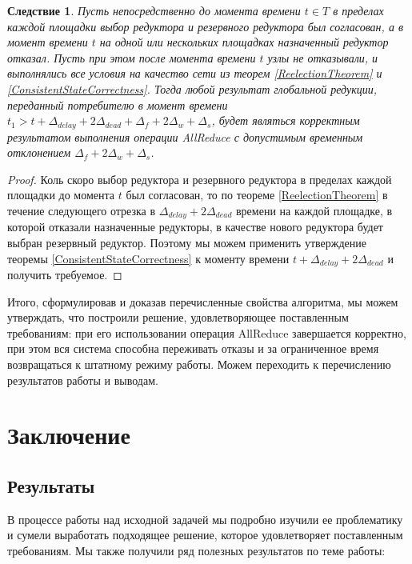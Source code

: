 \documentclass{article}
\theoremstyle{plain}
\theoremstyle{plain}
\newtheorem{consequence}[theorem]{Следствие}
\theoremstyle{plain}
\theoremstyle{plain}
\theoremstyle{definition}
\theoremstyle{remark}
\theoremstyle{plain}
\begin{document}
\begin{consequence}
    Пусть непосредственно до момента времени $t \in T$ в пределах каждой площадки выбор редуктора и резервного редуктора был согласован, а в момент времени $t$ на одной или нескольких площадках назначенный редуктор отказал. Пусть при этом после момента времени $t$ узлы не отказывали, и выполнялись все условия на качество сети из теорем \ref{ReelectionTheorem} и \ref{ConsistentStateCorrectness}. Тогда любой результат глобальной редукции, переданный потребителю в момент времени $t_1 > t + \Delta_{delay} + 2\Delta_{dead} + \Delta_f + 2\Delta_w + \Delta_s$, будет являться корректным результатом выполнения операции AllReduce с допустимым временным отклонением $\Delta_f + 2\Delta_w + \Delta_s$.
\end{consequence}
\begin{proof}
    Коль скоро выбор редуктора и резервного редуктора в пределах каждой площадки до момента $t$ был согласован, то по теореме \ref{ReelectionTheorem} в течение следующего отрезка в $\Delta_{delay} + 2\Delta_{dead}$ времени на каждой площадке, в которой отказали назначенные редукторы, в качестве нового редуктора будет выбран резервный редуктор. Поэтому мы можем применить утверждение теоремы \ref{ConsistentStateCorrectness} к моменту времени $t + \Delta_{delay} + 2\Delta_{dead}$ и получить требуемое.
\end{proof}

Итого, сформулировав и доказав перечисленные свойства алгоритма, мы можем утверждать, что построили решение, удовлетворяющее поставленным требованиям: при его использовании операция AllReduce завершается корректно, при этом вся система способна переживать отказы и за ограниченное время возвращаться к штатному режиму работы. Можем переходить к перечислению результатов работы и выводам.

\section{Заключение}

\subsection{Результаты}

В процессе работы над исходной задачей мы подробно изучили ее проблематику и сумели выработать подходящее решение, которое удовлетворяет поставленным требованиям. Мы также получили ряд полезных результатов по теме работы:
\end{document}
